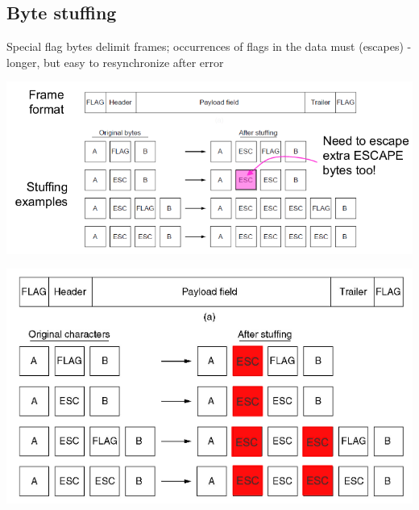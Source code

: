 \documentclass{article}[18pt]
\begin{document}
\subsection{Byte stuffing}
Special flag bytes delimit frames; occurrences of flags in the data must (escapes) - longer, but easy to resynchronize after error
\begin{center}
	\includegraphics[scale=0.7]{"byte stuffing"}
\end{center}
\begin{center}
	\includegraphics[scale=0.7]{"byte stuffing1"}
\end{center}
\end{document}
